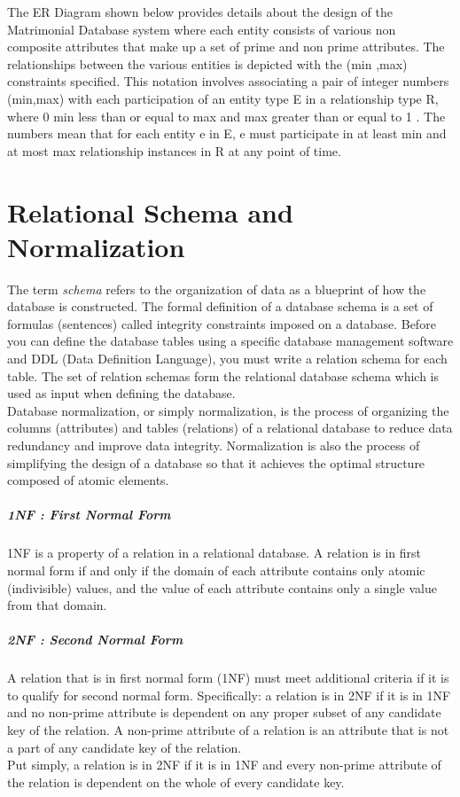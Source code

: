 \documentclass[12pt]{report}
\begin{document}
The ER Diagram shown below provides details about the design of the Matrimonial Database system where each entity consists of various non composite attributes that make up a set of prime and non prime attributes. The relationships between the various entities is depicted with the (min ,max) constraints specified. This notation involves associating a pair of integer numbers (min,max) with each participation of an entity type E in a relationship type R, where 0 min less than or equal to max and max greater than or equal to 1 . The numbers mean that for each entity e in E, e must participate in at least min and at most max relationship instances in R at any point of time.  


\chapter{Relational Schema and Normalization}
The term \emph{schema} refers to the organization of data as a blueprint of how the database is constructed. The formal definition of a database schema is a set of formulas (sentences) called integrity constraints imposed on a database. Before you can define the database tables using a specific database management software and DDL (Data Definition Language), you must write a relation schema for each table. The set of relation schemas form the relational database schema which is used as input when defining the database.\\

Database normalization, or simply normalization, is the process of organizing the columns (attributes) and tables (relations) of a relational database to reduce data redundancy and improve data integrity. Normalization is also the process of simplifying the design of a database so that it achieves the optimal structure composed of atomic elements. 

\paragraph*{1NF : First Normal Form}
1NF is a property of a relation in a relational database. A relation is in first normal form if and only if the domain of each attribute contains only atomic (indivisible) values, and the value of each attribute contains only a single value from that domain.

\paragraph*{2NF : Second Normal Form}
A relation that is in first normal form (1NF) must meet additional criteria if it is to qualify for second normal form. Specifically: a relation is in 2NF if it is in 1NF and no non-prime attribute is dependent on any proper subset of any candidate key of the relation. A non-prime attribute of a relation is an attribute that is not a part of any candidate key of the relation. \\
Put simply, a relation is in 2NF if it is in 1NF and every non-prime attribute of the relation is dependent on the whole of every candidate key.
\end{document}
